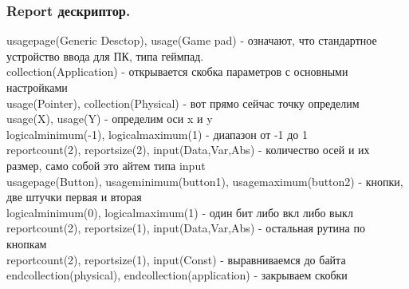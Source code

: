 \documentclass[12pt,a4paper]{article}
\begin{document}
\subsubsection{Report дескриптор.}
    usage\textunderscore page(Generic Desctop), usage(Game pad) - означают, что стандартное
    устройство ввода для ПК, типа геймпад.\\
    collection(Application) - открывается скобка параметров с основными
    настройками\\
    usage(Pointer), collection(Physical) - вот прямо сейчас точку определим\\
    usage(X), usage(Y) - определим оси x и y\\
    logical\textunderscore minimum(-1), logical\textunderscore maximum(1) - диапазон от -1 до 1\\
    report\textunderscore count(2), report\textunderscore size(2), input(Data,Var,Abs) - количество осей и их
    размер, само собой это айтем типа input\\
    usage\textunderscore page(Button), usage\textunderscore minimum(button1), usage\textunderscore maximum(button2) - кнопки,
    две штучки первая и вторая\\
    logical\textunderscore minimum(0), logical\textunderscore maximum(1) - один бит либо вкл либо выкл\\
    report\textunderscore count(2), report\textunderscore size(1), input(Data,Var,Abs) - остальная рутина по
    кнопкам\\
    report\textunderscore count(2), report\textunderscore size(1), input(Const) - выравниваемся до байта\\
    end\textunderscore collection(physical), end\textunderscore collection(application) - закрываем скобки
\end{document}
